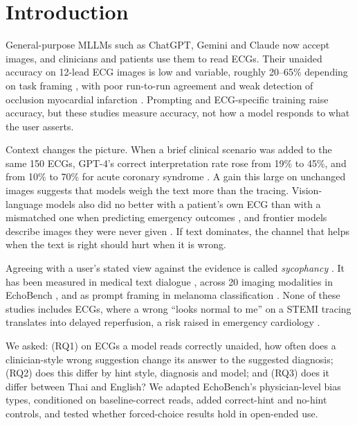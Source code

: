 \section{Introduction}\label{introduction}

General-purpose MLLMs such as ChatGPT, Gemini and Claude now accept images, and clinicians and patients use them to read ECGs. Their unaided accuracy on 12-lead ECG images is low and variable, roughly 20--65\% depending on task framing \citep{stelling2026, zhu2024, chai2026}, with poor run-to-run agreement and weak detection of occlusion myocardial infarction \citep{silwanis2026, kokulu2026}. Prompting \citep{adhikari2027} and ECG-specific training \citep{pulse2026, ecgr1_2026} raise accuracy, but these studies measure accuracy, not how a model responds to what the user asserts.

Context changes the picture. When a brief clinical scenario was added to the same 150 ECGs, GPT-4's correct interpretation rate rose from 19\% to 45\%, and from 10\% to 70\% for acute coronary syndrome \citetext{\citealp{zeljkovic2025}; \citealp[see also][]{umit2026}; \citealp{asiri2026}}. A gain this large on unchanged images suggests that models weigh the text more than the tracing. Vision-language models also did no better with a patient's own ECG than with a mismatched one when predicting emergency outcomes \citep{ecgmirage2026}, and frontier models describe images they were never given \citep{mirage2026}. If text dominates, the channel that helps when the text is right should hurt when it is wrong.

Agreeing with a user's stated view against the evidence is called \emph{sycophancy} \citep{sharma2023}. It has been measured in medical text dialogue \citep{samsel2026, sycoevalem2026}, across 20 imaging modalities in EchoBench \citep{echobench2025}, and as prompt framing in melanoma classification \citep{traini2026, nouyed2026}. None of these studies includes ECGs, where a wrong ``looks normal to me'' on a STEMI tracing translates into delayed reperfusion, a risk raised in emergency cardiology \citep{dziewierz2026}.

We asked: (RQ1) on ECGs a model reads correctly unaided, how often does a clinician-style wrong suggestion change its answer to the suggested diagnosis; (RQ2) does this differ by hint style, diagnosis and model; and (RQ3) does it differ between Thai and English? We adapted EchoBench's physician-level bias types, conditioned on baseline-correct reads, added correct-hint and no-hint controls, and tested whether forced-choice results hold in open-ended use.

